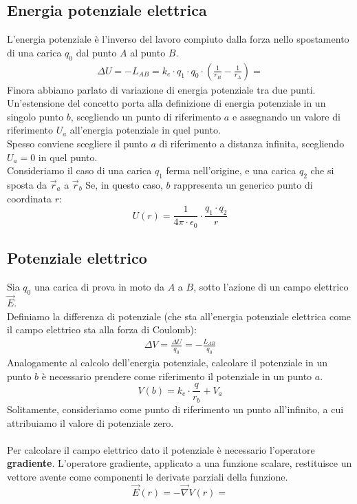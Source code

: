 \subsection{Energia potenziale elettrica}
L'energia potenziale è l'inverso del lavoro compiuto dalla forza nello spostamento di una carica $q_0$ dal punto $A$ al punto $B$.
	\begin{displaymath}\begin{aligned}
		\Delta U = - L_{AB} =
        k_e\cdot q_1 \cdot q_0 \cdot  \left(\frac{1}{r_B} - \frac{1}{r_A}\right) = 
	\end{aligned}\end{displaymath}
Finora abbiamo parlato di variazione di energia potenziale tra due punti. Un'estensione del concetto porta alla definizione di energia potenziale in un singolo punto $b$, scegliendo un punto di riferimento $a$ e assegnando un valore di riferimento $U_a$ all'energia potenziale in quel punto.\\
Spesso conviene scegliere il punto $a$ di riferimento a distanza infinita, scegliendo $U_a = 0$ in quel punto.\\
Consideriamo il caso di una carica $q_1$ ferma nell'origine, e una carica $q_2$ che si sposta da $\vec{r}_a$ a $\vec{r}_b$
Se, in questo caso, $b$ rappresenta un generico punto di coordinata $r$:
	\begin{displaymath}
		U(r) = \frac{1}{4 \pi \cdot \epsilon_0}
		\cdot \frac{q_1 \cdot q_2}{r}
	\end{displaymath}


\subsection{Potenziale elettrico}
Sia $q_0$ una carica di prova in moto da $A$ a $B$, sotto l'azione di un campo elettrico $\vec{E}$.\\
Definiamo la differenza di potenziale (che sta all'energia potenziale elettrica come il campo elettrico sta alla forza di Coulomb):
	\begin{displaymath}\begin{aligned}
			\Delta V= \frac{\Delta U}{q_0} = -  \frac{L_{AB}}{q_0}
	\end{aligned}\end{displaymath}
Analogamente al calcolo dell'energia potenziale,  calcolare il potenziale in un punto $b$ è necessario prendere come riferimento il potenziale in un punto $a$.\\
\begin{displaymath}
	V(b) = k_e \cdot \frac{q}{r_b} + V_a
\end{displaymath}	
Solitamente, consideriamo come punto di riferimento un punto all'infinito, a cui attribuiamo il valore di potenziale zero.\\\\ 
Per calcolare il campo elettrico dato il potenziale è necessario l'operatore \textbf{gradiente}. L'operatore gradiente, applicato a una funzione scalare, restituisce un vettore avente come componenti le derivate parziali della funzione.
\begin{displaymath}
	\vec{E}(r) = - \vec{\nabla} V(r)=
\end{displaymath}

